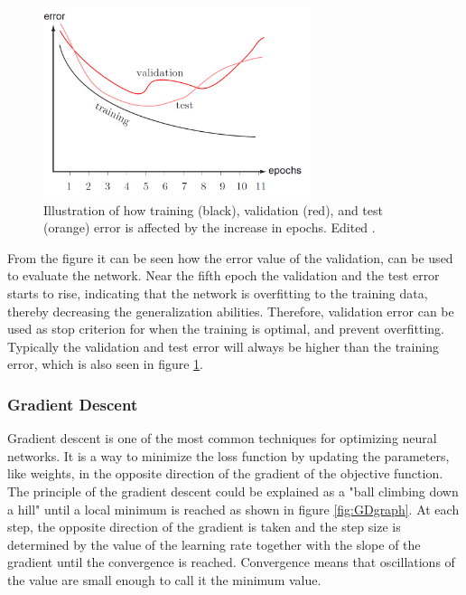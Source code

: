 \begin{figure} [H]
\centering
\includegraphics[width=0.7\textwidth]{figures/learningCurves}
\caption{Illustration of how training (black), validation (red), and test (orange) error is affected by the increase in epochs. Edited \citep{Duda2000}.}
\label{fig:learningCurve}
\end{figure}

\noindent
From the figure it can be seen how the error value of the validation, can be used to evaluate the network. 
Near the fifth epoch the validation and the test error starts to rise, indicating that the network is overfitting to the training data, thereby decreasing the generalization abilities. Therefore, validation error can be used as stop criterion for when the training is optimal, and prevent overfitting. 
Typically the validation and test error will always be higher than the training error, which is also seen in figure \ref{fig:learningCurve}.\citep{Duda2000}

\subsubsection{Gradient Descent} \label{sec:optimizers}
Gradient descent is one of the most common techniques for optimizing neural networks. It is a way to minimize the loss function by updating the parameters, like weights, in the opposite direction of the gradient of the objective function.\citep{Ruder2016} The principle of the gradient descent could be explained as a "ball climbing down a hill" until a local minimum is reached as shown in figure \ref{fig:GDgraph}. At each step, the opposite direction of the gradient is taken and the step size is determined by the value of the learning rate together with the slope of the gradient until the convergence is reached. Convergence means that oscillations of the value are small enough to call it the minimum value.\citep{Raschka2016}

